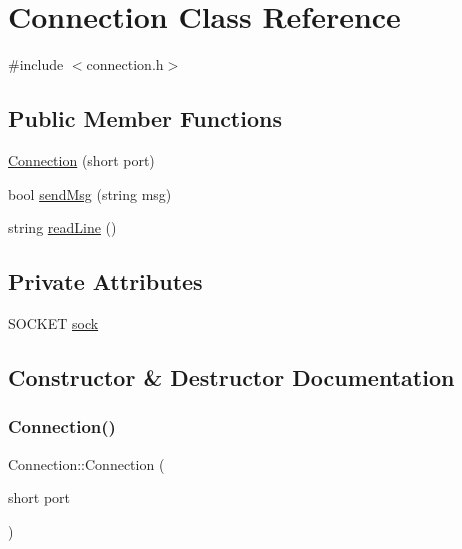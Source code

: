 \hypertarget{class_connection}{}\section{Connection Class Reference}
\label{class_connection}


{\ttfamily \#include $<$connection.\+h$>$}

\subsection*{Public Member Functions}
\begin{DoxyCompactItemize}
\item 
\mbox{\hyperlink{class_connection_a8089476d48ba545f44e691cd4bd0278d}{Connection}} (short port)
\item 
bool \mbox{\hyperlink{class_connection_a4b9f6db1fb42fc9857f829fa0bc52e6e}{send\+Msg}} (string msg)
\item 
string \mbox{\hyperlink{class_connection_a1df16b436751b686d96c24ca0c498659}{read\+Line}} ()
\end{DoxyCompactItemize}
\subsection*{Private Attributes}
\begin{DoxyCompactItemize}
\item 
S\+O\+C\+K\+ET \mbox{\hyperlink{class_connection_a50ca7c17a64836ca25a1fe9953cc6cf6}{sock}}
\end{DoxyCompactItemize}


\subsection{Constructor \& Destructor Documentation}
\mbox{\label{class_connection_a8089476d48ba545f44e691cd4bd0278d}} 
\subsubsection{\texorpdfstring{Connection()}{Connection()}}
{\footnotesize\ttfamily Connection\+::\+Connection (\begin{DoxyParamCaption}\item[{short}]{port }\end{DoxyParamCaption})}



